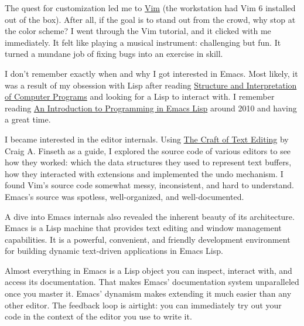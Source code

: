 \documentclass{article}
\begin{document}
The quest for customization led me to \href{https://www.vim.org/}{Vim} (the workstation had Vim 6 installed out of the box).
After all, if the goal is to stand out from the crowd, why stop at the color scheme?
I went through the Vim tutorial, and it clicked with me immediately.
It felt like playing a musical instrument: challenging but fun.
It turned a mundane job of fixing bugs into an exercise in skill.

I don't remember exactly when and why I got interested in Emacs.
Most likely, it was a result of my obsession with Lisp after reading \href{https://en.wikipedia.org/wiki/Structure_and_Interpretation_of_Computer_Programs}{Structure and Interpretation of Computer Programs} and looking for a Lisp to interact with.
I remember reading \href{https://www.gnu.org/software/emacs/manual/eintr.html}{An Introduction to Programming in Emacs Lisp} around 2010 and having a great time.

I became interested in the editor internals.
Using \href{https://www.finseth.com/craft/}{The Craft of Text Editing} by Craig A. Finseth as a guide, I explored the source code of various editors to see how they worked: which the data structures they used to represent text buffers, how they interacted with extensions and implemented the undo mechanism.
I found Vim's source code somewhat messy, inconsistent, and hard to understand.
Emacs's source was spotless, well-organized, and well-documented.

A dive into Emacs internals also revealed the inherent beauty of its architecture.
Emacs is a Lisp machine that provides text editing and window management capabilities.
It is a powerful, convenient, and friendly development environment for building dynamic text-driven applications in Emacs Lisp.

Almost everything in Emacs is a Lisp object you can inspect, interact with, and access its documentation.
That makes Emacs' documentation system unparalleled once you master it.
Emacs' dynamism makes extending it much easier than any other editor.
The feedback loop is airtight: you can immediately try out your code in the context of the editor you use to write it.
\end{document}
